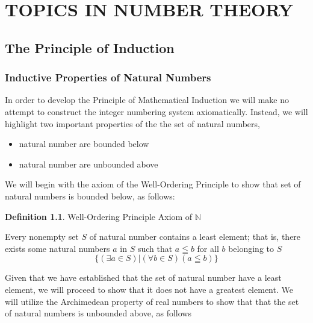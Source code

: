 \documentclass{book}
\theoremstyle{definition}
\newtheorem{definition}{Definition}[section]
\theoremstyle{remark}
\newcommand{\bb}[1]{\mathbb{#1}}
\begin{document}
\newpage
\chapter{TOPICS IN NUMBER THEORY}

\section{The Principle of Induction}
\subsection{Inductive Properties of Natural Numbers}

In order to develop the Principle of Mathematical Induction we will make no attempt to construct the integer numbering system axiomatically. Instead, we will highlight two important properties of the the set of natural numbers,
    \begin{itemize}
        \item natural number are bounded below
        \item natural number are unbounded above
    \end{itemize}
We will begin with the axiom of the Well-Ordering Principle to show that set of natural numbers is bounded below, as follows:    

\begin{definition}
Well-Ordering Principle Axiom of $\bb{N}$ \\

\begin{tcolorbox}
    Every nonempty set $S$ of natural number contains a least element; that is, there exists some natural numbers $a$ in $S$ such that $a \leqq b$ for all $b$ belonging to $S$
        \begin{equation*}
            \{ (\exists a \in S) | (\forall b \in S)(a \leqq b) \}
        \end{equation*}
\end{tcolorbox}
\end{definition}


Given that we have established that the set of natural number have a least element, we will proceed to show that it does not have a greatest element. We will utilize the Archimedean property of real numbers to show that that the set of natural numbers is unbounded above, as follows
\end{document}
